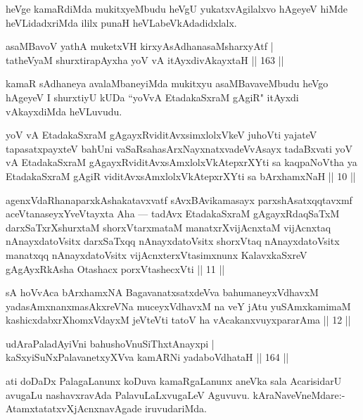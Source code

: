 \begin{artha}%
heVge kamaRdiMda mukitxyeMbudu heVgU yukatxvAgilalxvo hAgeyeV hiMde heVLidadxriMda ililx punaH heVLabeVkAdadidxlalx.
\end{artha}

\begin{shl}
asaMBavoV yathA muketxVH kirxyAsAdhanasaMsharxyAtf |\\
tatheVyaM shurxtirapAyxha yoV vA itAyxdivAkayxtaH \hfill || 163 ||
\end{shl}

\begin{artha}
kamaR sAdhaneya avalaMbaneyiMda mukitxyu asaMBavaveMbudu heVgo hAgeyeV I shurxtiyU kUDa ``yoVvA EtadakaSxraM gAgiR" itAyxdi vAkayxdiMda heVLuvudu.
\end{artha}

\begin{shl}
yoV vA EtadakaSxraM gAgayxRviditAvxsimxlolxVkeV juhoVti yajateV tapasatxpayxteV bahUni vaSaRsahasArxNayxnatxvadeVvAsayx tadaBxvati yoV vA EtadakaSxraM gAgayxRviditAvxsAmxlolxVkAtepxrXYti sa kaqpaNoV\s tha ya EtadakaSxraM gAgiR viditAvxsAmxlolxVkAtepxrXYti sa bArxhamxNaH || 10 ||

agenxVdaRhanaparxkAshakatavxvatf sAvxBAvikamasayx parxshAsatxqqtavxmf aceVtanaseyxYveVtayxta Aha — tadAvx EtadakaSxraM gAgayxRdaqSaTxM darxSaTxrXshurxtaM shorxVtarxmataM manatxrXvijAcnxtaM vijAcnxtaq nAnayxdatoV\s sitx darxSaTxqq nAnayxdatoV\s sitx shorxVtaq nAnayxdatoV\s sitx manatxqq nAnayxdatoV\s sitx vijAcnxterxVtasimxnunx KalavxkaSxreV gAgAyxRkAsha Otashacx porxVtashecxVti || 11 ||

sA hoVvAca bArxhamxNA BagavanatxsatxdeVva bahumaneyxVdhavxM yadasAmxnanxmasAkxreVNa muceyxVdhavxM na veY jAtu yuSAmxkamimaM kashicxdabxrXhomxVdayxM jeVteVti tatoV ha vAcakanxvuyxpararAma || 12 ||
\end{shl}


\begin{shl}
udAraPaladAyiVni bahushoV\s nuSiThxtAnayxpi |\\
kaSxyiSuNxPalavanetxyXVva kamARNi yadaboVdhataH \hfill || 164 ||
\end{shl}

\begin{artha}
ati doDaDx PalagaLanunx koDuva kamaRgaLanunx aneVka sala AcarisidarU avugaLu nashavxravAda PalavuLaLxvugaLeV Aguvuvu. kAraNaveVneMdare:- AtamxtatatxvXjAcnxnavAgade iruvudariMda.
\end{artha}

